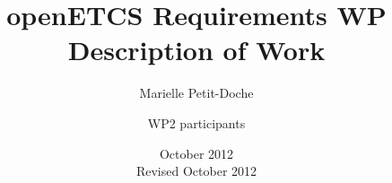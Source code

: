 \documentclass{template/openetcs_article}
\begin{document}
\frontmatter
{}




\title{openETCS Requirements WP Description of Work}


\date{October 2012\\Revised October 2012}


\author{Marielle Petit-Doche}


\author{WP2 participants}







\begin{abstract}

\end{abstract}

\maketitle
\tableofcontents
\listoffiguresandtables
\newpage



\end{document}
